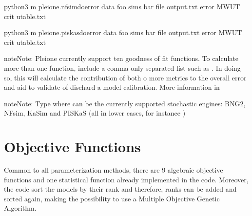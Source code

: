 \documentclass[letterpaper,10pt,english]{sphinxmanual}
\begin{document}

\begin{sphinxVerbatim}[commandchars=\\\{\}]
python3 \PYGZhy{}m pleione.nfsim\PYGZhy{}doerror \PYGZhy{}\PYGZhy{}data foo \PYGZhy{}\PYGZhy{}sims bar 
\PYGZhy{}\PYGZhy{}file output.txt \PYGZhy{}\PYGZhy{}error MWUT \PYGZhy{}\PYGZhy{}crit utable.txt
\end{sphinxVerbatim}


\begin{sphinxVerbatim}[commandchars=\\\{\}]
python3 \PYGZhy{}m pleione.piskas\PYGZhy{}doerror \PYGZhy{}\PYGZhy{}data foo \PYGZhy{}\PYGZhy{}sims bar 
\PYGZhy{}\PYGZhy{}file output.txt \PYGZhy{}\PYGZhy{}error MWUT \PYGZhy{}\PYGZhy{}crit utable.txt
\end{sphinxVerbatim}

\begin{sphinxadmonition}{note}{Note:}
Pleione currently support ten goodness of fit functions. To calculate more
than one function, include a comma-only separated list such as .
In doing so, this will calculate the contribution of both o more metrics to
the overall error and aid to validate of dischard a model calibration.
More information in {\hyperref[\detokenize{ObjectiveFunctions:fitneess-functions}]{}}
\end{sphinxadmonition}

\begin{sphinxadmonition}{note}{Note:}
Type  where
 can be the currently supported stochastic engines: BNG2,
NFsim, KaSim and PISKaS (all in lower cases, for instance )
\end{sphinxadmonition}


\section{Objective Functions}
\label{\detokenize{ObjectiveFunctions:objective-functions}}\label{\detokenize{ObjectiveFunctions:fitneess-functions}}\label{\detokenize{ObjectiveFunctions::doc}}
Common to all parameterization methods, there are 9 algebraic objective
functions and one statistical function already implemented in the code.
Moreover, the code sort the models by their rank and therefore, ranks can be
added and sorted again, making the possibility to use a Multiple Objective
Genetic Algorithm.
\end{document}
